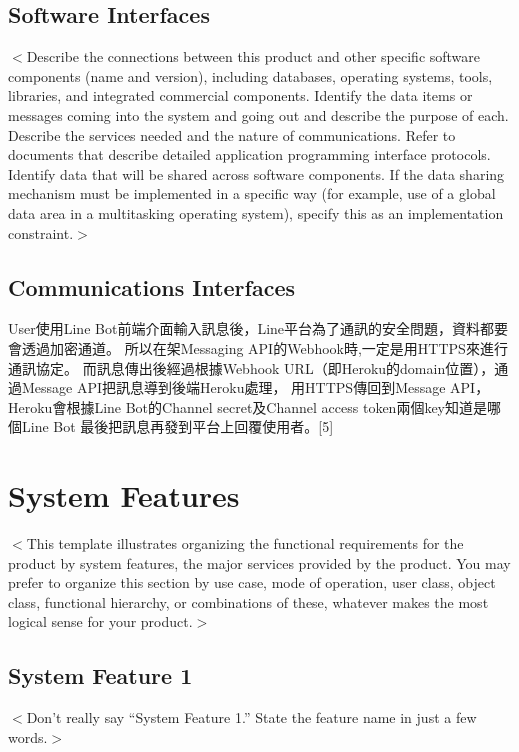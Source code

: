 \documentclass{scrreprt}
\begin{document}
\section{Software Interfaces}
\begin{CJK}{UTF8}{<font>}
$<$Describe the connections between this product and other specific software 
components (name and version), including databases, operating systems, tools, 
libraries, and integrated commercial components. Identify the data items or 
messages coming into the system and going out and describe the purpose of each.  
Describe the services needed and the nature of communications. Refer to 
documents that describe detailed application programming interface protocols.  
Identify data that will be shared across software components. If the data 
sharing mechanism must be implemented in a specific way (for example, use of a 
global data area in a multitasking operating system), specify this as an 
implementation constraint.$>$
\end{CJK}

\section{Communications Interfaces}
\begin{CJK}{UTF8}{<font>}
User使用Line Bot前端介面輸入訊息後，Line平台為了通訊的安全問題，資料都要會透過加密通道。
所以在架Messaging API的Webhook時,一定是用HTTPS來進行通訊協定。
而訊息傳出後經過根據Webhook URL（即Heroku的domain位置），通過Message API把訊息導到後端Heroku處理，
用HTTPS傳回到Message API，Heroku會根據Line Bot的Channel secret及Channel access token兩個key知道是哪個Line Bot
最後把訊息再發到平台上回覆使用者。[5]
\end{CJK}


\chapter{System Features}
\begin{CJK}{UTF8}{<font>}
$<$This template illustrates organizing the functional requirements for the 
product by system features, the major services provided by the product. You may 
prefer to organize this section by use case, mode of operation, user class, 
object class, functional hierarchy, or combinations of these, whatever makes the 
most logical sense for your product.$>$
\end{CJK}

\section{System Feature 1}
$<$Don’t really say “System Feature 1.” State the feature name in just a few 
words.$>$
\end{document}
